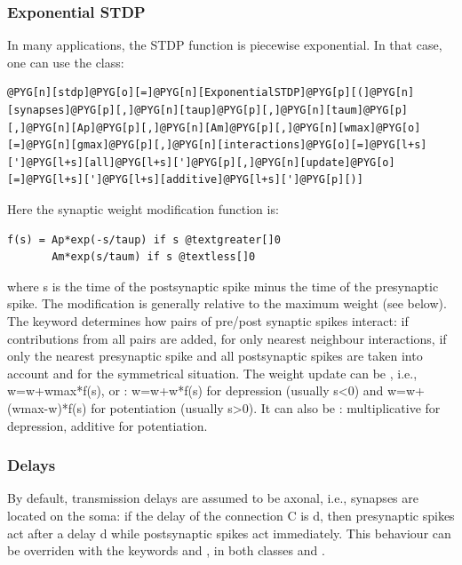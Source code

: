 \documentclass[letterpaper,10pt,english]{manual}
\begin{document}
\subsubsection{Exponential STDP}

In many applications, the STDP function is piecewise exponential.
In that case, one can use the \hyperlink{brian.ExponentialSTDP}{} class:

\begin{Verbatim}[commandchars=@\[\]]
@PYG[n][stdp]@PYG[o][=]@PYG[n][ExponentialSTDP]@PYG[p][(]@PYG[n][synapses]@PYG[p][,]@PYG[n][taup]@PYG[p][,]@PYG[n][taum]@PYG[p][,]@PYG[n][Ap]@PYG[p][,]@PYG[n][Am]@PYG[p][,]@PYG[n][wmax]@PYG[o][=]@PYG[n][gmax]@PYG[p][,]@PYG[n][interactions]@PYG[o][=]@PYG[l+s][']@PYG[l+s][all]@PYG[l+s][']@PYG[p][,]@PYG[n][update]@PYG[o][=]@PYG[l+s][']@PYG[l+s][additive]@PYG[l+s][']@PYG[p][)]
\end{Verbatim}

Here the synaptic weight modification function is:

\begin{Verbatim}[commandchars=@\[\]]
f(s) = Ap*exp(-s/taup) if s @textgreater[]0
       Am*exp(s/taum) if s @textless[]0
\end{Verbatim}

where s is the time of the postsynaptic spike minus the time of the presynaptic spike.
The modification is generally relative to the maximum weight  (see below).
The  keyword determines
how pairs of pre/post synaptic spikes interact:  if contributions from
all pairs are added,  for only nearest neighbour interactions,
 if only the nearest presynaptic spike and all postsynaptic
spikes are taken into account and  for the symmetrical situation.
The weight update can be , i.e., w=w+wmax*f(s), or :
w=w+w*f(s) for depression (usually s\textless{}0) and w=w+(wmax-w)*f(s) for potentiation
(usually s\textgreater{}0). It can also be : multiplicative for depression, additive for
potentiation.


\subsubsection{Delays}

By default, transmission delays are assumed to be axonal, i.e., synapses are located
on the soma: if the delay of the connection C is d, then presynaptic spikes act after
a delay d while postsynaptic spikes act immediately. This behaviour can be overriden with
the keywords  and , in both classes  and
.
\end{document}
